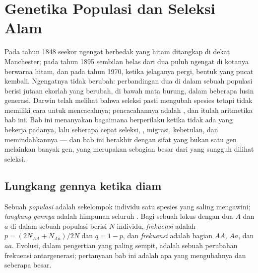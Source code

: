 \chapter{Genetika Populasi dan Seleksi Alam}\label{ch:b2:population-genetics}

Pada tahun 1848 seekor ngengat berbedak yang hitam ditangkap di dekat
Manchester; pada tahun 1895 sembilan belas dari dua puluh ngengat di
kotanya berwarna hitam, dan pada tahun 1970, ketika jelaganya pergi,
bentuk yang pucat kembali. Ngengatnya tidak berubah: perbandingan dua
 di dalam sebuah populasi berisi jutaan ekorlah yang berubah, di
bawah mata burung, dalam beberapa lusin generasi. Darwin telah melihat
bahwa seleksi pasti mengubah spesies tetapi tidak memiliki cara untuk
mencacahnya; pencacahannya adalah , dan itulah
aritmetika bab ini. Bab ini menanyakan bagaimana 
berperilaku ketika tidak ada yang bekerja padanya, lalu seberapa cepat
seleksi, , migrasi, kebetulan, dan  memindahkannya
--- dan bab ini berakhir dengan sifat yang bukan satu gen melainkan
banyak gen, yang merupakan sebagian besar dari yang sungguh dilihat
seleksi.

\section{Lungkang gennya ketika diam}

\begin{definition}\label{def:b2:population-genetics:frequencies}
Sebuah \emph{populasi} adalah sekelompok individu satu spesies yang
saling mengawini; \emph{lungkang gennya} adalah himpunan seluruh
. Bagi sebuah lokus dengan dua  $A$ dan $a$ di dalam sebuah
populasi  berisi $N$ individu, \emph{frekuensi } adalah
$p = (2N_{AA} +
N_{Aa})/2N$ dan $q = 1 - p$, dan \emph{frekuensi
} adalah bagian $AA$, $Aa$, dan $aa$. Evolusi, dalam
pengertian yang paling sempit, adalah sebuah perubahan frekuensi 
antargenerasi; pertanyaan bab ini adalah apa yang mengubahnya dan
seberapa besar.
\end{definition}

